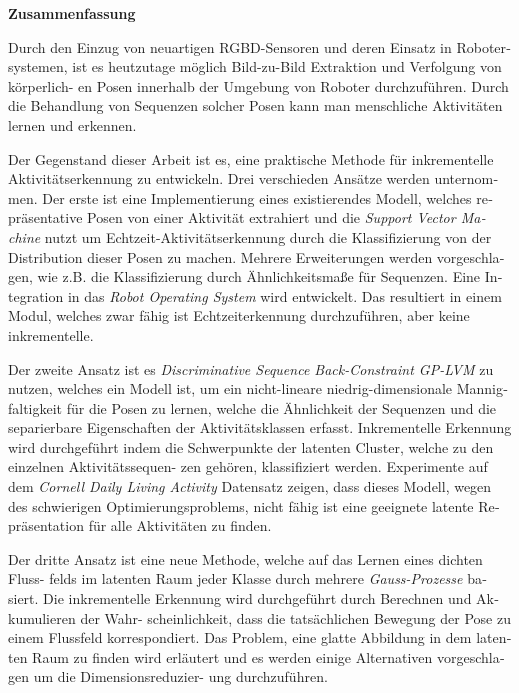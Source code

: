 



\cleardoublepage



\vspace*{2cm}
\begin{center}
{\Large \bf Zusammenfassung}
\end{center}
\vspace{1cm}

\begin{otherlanguage}{ngerman}
Durch den Einzug von neuartigen RGBD-Sensoren und deren Einsatz in Robotersystemen, ist es heutzutage m\"oglich Bild-zu-Bild Extraktion und Verfolgung von
k\"orperlich- en Posen innerhalb der Umgebung von Roboter durchzuf\"uhren. Durch die Behandlung von Sequenzen solcher Posen kann man menschliche Aktivit\"aten lernen und erkennen.

Der Gegenstand dieser Arbeit ist es, eine praktische Methode f\"ur inkrementelle Aktivit\"atserkennung zu entwickeln. Drei verschieden Ans\"atze werden unternommen. Der erste ist eine Implementierung eines existierendes Modell, welches repr\"asentative Posen von einer Aktivit\"at extrahiert und die \textit{Support Vector Machine} nutzt um Echtzeit-Aktivit\"atserkennung durch die Klassifizierung von der Distribution dieser Posen zu machen.
Mehrere Erweiterungen werden vorgeschlagen, wie z.B. die Klassifizierung durch \"Ahnlichkeitsma\ss{}e f\"ur Sequenzen. Eine Integration in das \textit{Robot Operating System} wird entwickelt. Das resultiert in einem Modul, welches zwar f\"ahig ist Echtzeiterkennung durchzuf\"uhren, aber keine inkrementelle.

Der zweite Ansatz ist es \textit{Discriminative Sequence Back-Constraint GP-LVM} zu nutzen, welches ein Modell ist, um ein nicht-lineare niedrig-dimensionale Mannigfaltigkeit f\"ur die Posen zu lernen, welche die \"Ahnlichkeit der Sequenzen und die separierbare Eigenschaften der Aktivit\"atsklassen erfasst. Inkrementelle Erkennung wird durchgef\"uhrt indem die Schwerpunkte der latenten Cluster, welche zu den einzelnen Aktivit\"atssequen- zen geh\"oren, klassifiziert werden. Experimente auf dem \textit{Cornell Daily Living Activity} Datensatz zeigen, dass dieses Modell, wegen des schwierigen Optimierungsproblems, nicht f\"ahig ist eine geeignete latente Repr\"asentation f\"ur alle Aktivit\"aten zu finden. 

Der dritte Ansatz ist eine neue Methode, welche auf das Lernen eines dichten Fluss- felds im latenten Raum jeder Klasse durch mehrere \textit{Gauss-Prozesse} basiert. Die inkrementelle Erkennung wird durchgef\"uhrt durch Berechnen und Akkumulieren der Wahr- scheinlichkeit, dass die tats\"achlichen Bewegung der Pose zu einem Flussfeld korrespondiert. Das Problem, eine glatte Abbildung in dem latenten Raum zu finden wird erl\"autert und es werden einige Alternativen vorgeschlagen um die Dimensionsreduzier- ung durchzuf\"uhren.
\end{otherlanguage}
